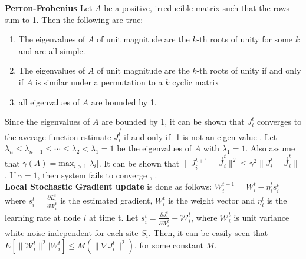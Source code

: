 \begin{thm} \textbf{Perron-Frobenius \cite{Varga_62}}
Let $A$ be a positive, irreducible matrix such that the rows sum to 1. Then the following are true:
\begin{enumerate}
\item The eigenvalues of $A$ of unit magnitude are the $k$-th roots of unity for some $k$ and are all simple.
\item The eigenvalues of $A$ of unit magnitude are the $k$-th roots of unity if and only if $A$ is similar under a permutation to a $k$ cyclic matrix
\item all eigenvalues of $A$ are bounded by 1.
\end{enumerate}
\end{thm}

Since the eigenvalues of $A$ are bounded by 1, it can be shown that $J_i^t$ converges to the average function estimate $\vec{J_i^t}$ if and only if -1 is not an eigen value \cite{Varga_62}. Let $\lambda_n \le \lambda_{n-1} \le \cdots \le \lambda_2 < \lambda_1 =1$ be the eigenvalues of $A$ with $\lambda_1 = 1$. Also assume that $\gamma (A) = \text{max}_{i>1} |\lambda_i|$. It can be shown that $\parallel J_i^{t+1} - \vec{J}_i^{t} \parallel^2 \le \gamma^2 \parallel J_i^{t} - \vec{J}_i^{t} \parallel$. If $\gamma=1$, then system fails to converge \cite{Varga_62}, \cite{Cybenko_89}. \\
 
 
\noindent \textbf{Local Stochastic Gradient update} is done as follows: $W_i^{t+1} = W_i^t - \eta_i^t s_i^t$ where $s_i^t=\frac{\partial L_i^t}{\partial W_i^t}$ is the estimated gradient, $W_i^t$ is the weight vector and $\eta_i^t$ is the learning rate at node $i$ at time t. 
Let $s_i^t=\frac{\partial J_i^t}{\partial W_i^t} + \mathcal{W}_i^t$, where $\mathcal{W}_i^t$ is unit variance white noise independent for each site $S_i$. Then, it can be easily seen that $E[\parallel \mathcal{W}_i^t \parallel^2 |W_i^t] \le M (\parallel \nabla J_i^t \parallel^2)$, for some constant $M$. \\



